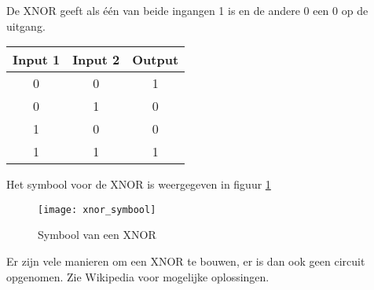 De XNOR geeft als \'e\'en van beide ingangen 1 is en de andere 0 een 0 op de uitgang.

\begin{tabular}{ |c|c|c| }
\hline
\rowcolor{gray!60}
	Input 1 & Input 2 & Output \\
	\hline
	0 & 0 & 1 \\
	\hline
	0 & 1 & 0 \\
	\hline
	1 & 0 & 0 \\
	\hline
	1 & 1 & 1 \\
	\hline
\end{tabular}

Het symbool voor de XNOR is weergegeven in figuur \ref{symbool:xnor}

\begin{figure}[h]
\texttt{[image: xnor\_symbool]}
\centering
\caption{Symbool van een XNOR}
\label{symbool:xnor}
\end{figure}

Er zijn vele manieren om een XNOR te bouwen, er is dan ook geen circuit opgenomen. Zie Wikipedia voor mogelijke oplossingen.

